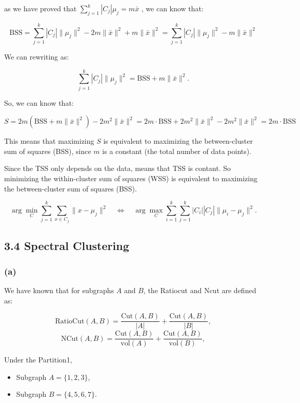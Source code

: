 \documentclass[12pt]{article}
\begin{document}
as we have proved that \( \sum_{j=1}^k |C_j| \mu_j = m \bar{x} \) , we can know that:

\[
    \text{BSS} = \sum_{j=1}^k |C_j| \| \mu_j \|^2 - 2 m \| \bar{x} \|^2 + m \| \bar{x} \|^2 = \sum_{j=1}^k |C_j| \| \mu_j \|^2 - m \| \bar{x} \|^2
\]

We can rewriting as:

\[
\sum_{j=1}^k |C_j| \| \mu_j \|^2 = \text{BSS} + m \| \bar{x} \|^2.
\]

So, we can know that:

\[
    S = 2 m \left( \text{BSS} + m \| \bar{x} \|^2 \right) - 2 m^2 \| \bar{x} \|^2 = 2 m \cdot \text{BSS} + 2 m^2 \| \bar{x} \|^2 - 2 m^2 \| \bar{x} \|^2 = 2 m \cdot \text{BSS}
\]

This means that maximizing \( S \) is equivalent to maximizing the between-cluster sum of squares (BSS), since \( m \) is a constant (the total number of data points).

Since the TSS only depends on the data, means that TSS is contant.
So minimizing the within-cluster sum of squares (WSS) is equivalent to maximizing the between-cluster sum of squares (BSS).

\[
\arg \min_C \sum_{j=1}^k \sum_{x \in C_j} \| x - \mu_j \|^2 \quad \Longleftrightarrow \quad \arg \max_C \sum_{i=1}^k \sum_{j=1}^k |C_i| |C_j| \| \mu_i - \mu_j \|^2.
\]

\subsection*{3.4 Spectral Clustering}

\subsubsection*{(a)}

We have known that for subgraphs $A$ and $B$, the Ratiocut and Ncut are defined as:

\[
    \text{RatioCut}(A, B) = \frac{\text{Cut}(A, B)}{|A|} + \frac{\text{Cut}(A, B)}{|B|},
\]
\[
   \text{NCut}(A, B) = \frac{\text{Cut}(A, B)}{\text{vol}(A)} + \frac{\text{Cut}(A, B)}{\text{vol}(B)},
\]

Under the Partition1, 
\begin{itemize}
    \item Subgraph \( A = \{1, 2, 3\} \),
    \item Subgraph \( B = \{4, 5, 6, 7\} \).
\end{itemize}
\end{document}
